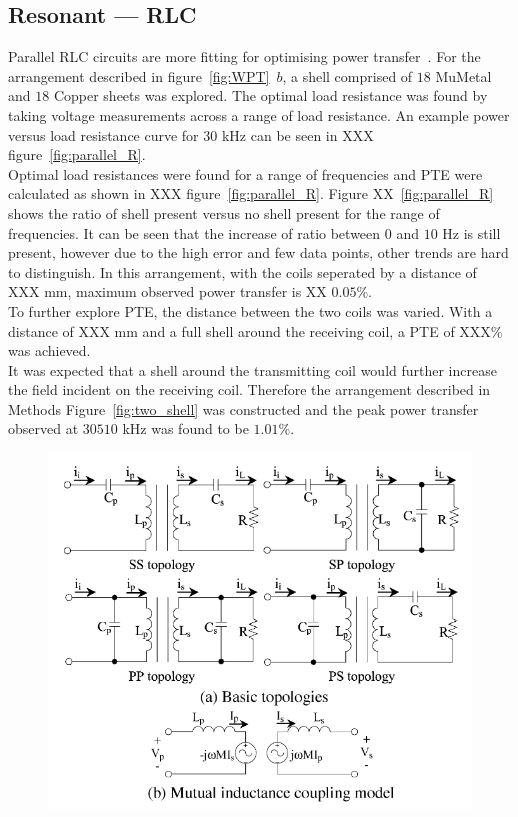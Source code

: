 \documentclass[11pt]{iopart}
\begin{document}
\subsection*{Resonant --- RLC}

Parallel RLC circuits are more fitting for optimising power
transfer~\cite{XXX}. For the arrangement described in
figure~\ref{fig:WPT}~$b$, a shell comprised of $18$ MuMetal and
$18$ Copper sheets was explored. The optimal load resistance was found
by taking voltage measurements across a range of load resistance. An
example power versus load resistance curve for $30$ kHz can be seen in
XXX figure~\ref{fig:parallel_R}.\\ Optimal load resistances were found
for a range of frequencies and PTE were calculated as shown in XXX
figure~\ref{fig:parallel_R}. Figure XX~\ref{fig:parallel_R} shows the
ratio of shell present versus no shell present for the range of
frequencies. It can be seen that the increase of ratio between $0$ and
$10$ Hz is still present, however due to the high error and few data
points, other trends are hard to distinguish. In this arrangement,
with the coils seperated by a distance of XXX mm, maximum observed
power transfer is XX $0.05\%$.\\
To further explore PTE, the distance between the two coils was
varied. With a distance of XXX mm and a full shell around the
receiving coil, a PTE of XXX\% was achieved.\\
It was expected that a shell around the transmitting coil would
further increase the field incident on the receiving coil. Therefore
the arrangement described in Methods Figure~\ref{fig:two_shell} was
constructed and the peak power transfer observed at $30510$ kHz was
found to be $1.01\%$.\\


\begin{figure}
  \begin{center}
   \noindent\includegraphics[width=0.75\linewidth]{images/temp-equiv_circ.png}
  \label{fig:RLC-eqcirc}
  \end{center}
  \caption{}
\end{figure}
\end{document}
